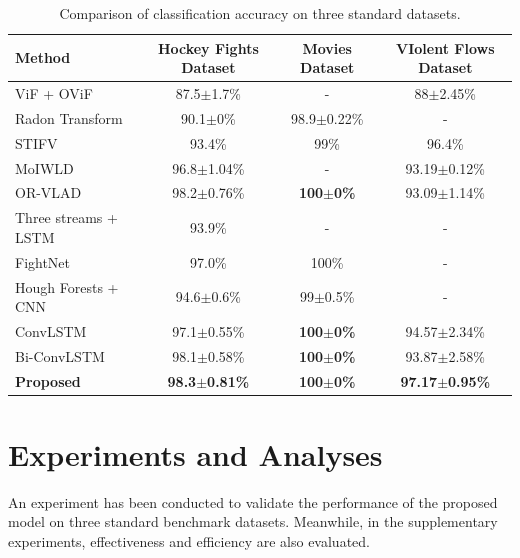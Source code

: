 \documentclass[10pt,twocolumn,letterpaper]{article}
\begin{document}

\begin{table}[t]
\begin{center}
\caption{Comparison of classification accuracy on three standard datasets.}
\label{table:result}
\begin{tabular}{lccc}
\hline
\textbf{Method} & \textbf{Hockey Fights Dataset} & \textbf{Movies Dataset} & \textbf{VIolent Flows Dataset} \\
\hline\hline
ViF + OViF \cite{ovif} & 87.5$\pm$1.7\% & - & 88$\pm$2.45\% \\
Radon Transform \cite{fast} & 90.1$\pm$0\% & 98.9$\pm$0.22\% & - \\
STIFV \cite{bilinski2016human} & 93.4\% & 99\% & 96.4\% \\
MoIWLD \cite{MoIWLD} & 96.8$\pm$1.04\% & - & 93.19$\pm$0.12\% \\
OR-VLAD \cite{vlad} & 98.2$\pm$0.76\% & \textbf{100$\pm$0\%} & 93.09$\pm$1.14\% \\
\hline
Three streams + LSTM \cite{dong2016multi} & 93.9\% & - & - \\
FightNet \cite{zhou2017violent} & 97.0\% & 100\% & - \\
Hough Forests + CNN \cite{serrano2018fight} & 94.6$\pm$0.6\% & 99$\pm$0.5\% & - \\
ConvLSTM \cite{convlstm_sudh} & 97.1$\pm$0.55\% & \textbf{100$\pm$0\%} & 94.57$\pm$2.34\% \\
Bi-ConvLSTM \cite{bi_convlstm} & 98.1$\pm$0.58\% & \textbf{100$\pm$0\%} & 93.87$\pm$2.58\% \\
\textbf{Proposed} & \textbf{98.3$\pm$0.81\%} & \textbf{100$\pm$0\%} & \textbf{97.17$\pm$0.95\%} \\
\hline
\end{tabular}
\end{center}
\end{table}


\section{Experiments and Analyses}
\label{sec:4}

An experiment has been conducted to validate the performance of the proposed model on three standard benchmark datasets.
Meanwhile, in the supplementary experiments, effectiveness and efficiency are also evaluated.
\end{document}
